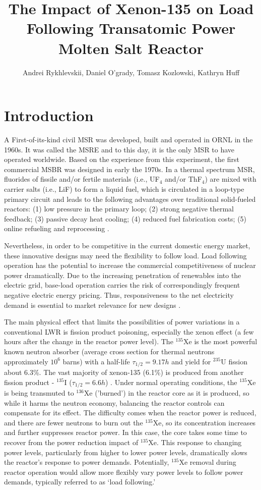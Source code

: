 \documentclass{anstrans}
\title{The Impact of Xenon-135 on Load Following Transatomic Power 
Molten Salt Reactor}
\author{Andrei Rykhlevskii, Daniel O'grady, Tomasz Kozlowski, Kathryn Huff}
\institute{
        Department of Nuclear, Plasma, and Radiological Engineering, University 
        of Illinois at Urbana-Champaign \break
        Urbana, IL
}
\begin{document}
\section{Introduction}
A First-of-its-kind civil \gls{MSR} was developed, built and operated in 
\gls{ORNL} in the 1960s. It was called the \gls{MSRE} and to this day, it is 
the only \gls{MSR} to have operated worldwide. Based on the experience 
from this experiment, the first commercial \gls{MSBR} was designed in early 
the 1970s. In a thermal spectrum \gls{MSR}, fluorides of fissile and/or 
fertile materials (i.e., UF$_4$ and/or ThF$_4$) are mixed with carrier salts 
(i.e., LiF) to form a liquid fuel, which is circulated in a loop-type primary 
circuit and leads to the following advantages over traditional solid-fueled 
reactors: (1) low pressure in the primary loop; (2) strong negative thermal 
feedback; (3) passive decay heat cooling; (4) reduced fuel fabrication costs; 
(5) online refueling and reprocessing \cite{haubenreich_experience_1970}.

Nevertheless, in order to be competitive in the current domestic energy 
market, these innovative designs may need the flexibility to follow load. 
Load following operation has the potential to increase the commercial 
competitiveness of nuclear power dramatically. Due to the increasing 
penetration of renewables into the electric grid, base-load operation carries 
the risk of correspondingly frequent negative electric energy pricing. Thus, 
responsiveness to the net electricity demand is essential to market relevance 
for new designs \cite{energy_information_administration_u.s._2016}.

The main physical effect that limits the possibilities of power variations in a 
conventional \gls{LWR} is fission product poisoning, especially the xenon 
effect (a few hours after the change in the reactor power level).  The 
$^{135}$Xe is the most powerful known neutron absorber (average cross section 
for thermal neutrons approximately $10^6$ barns) with a half-life  
$\tau_{1/2}=9.17h$ and yield for $^{235}$U fission about 6.3\%. The vast 
majority of xenon-135 (6.1\%) is produced from another fission product - 
$^{135}$I ($\tau_{1/2}=6.6h$) \cite{lokhov_technical_2011}. Under normal 
operating conditions, the $^{135}$Xe is being transmuted to $^{136}$Xe 
('burned') in the reactor core as it is produced, so while it harms the 
neutron economy, balancing the reactor controls can compensate 
for its effect. The difficulty comes when the reactor power is reduced, and 
there are fewer neutrons to burn out the $^{135}$Xe, so its concentration 
increases and further suppresses reactor power. In this case, the core takes 
some time to recover from the power reduction impact of $^{135}$Xe. This 
response to changing power levels, particularly from higher to lower power 
levels, dramatically slows the reactor's response to power demands. 
Potentially, $^{135}$Xe removal during reactor operation would allow more 
flexibly vary power levels to follow power demands, typically referred to 
as `load following.'
\end{document}
